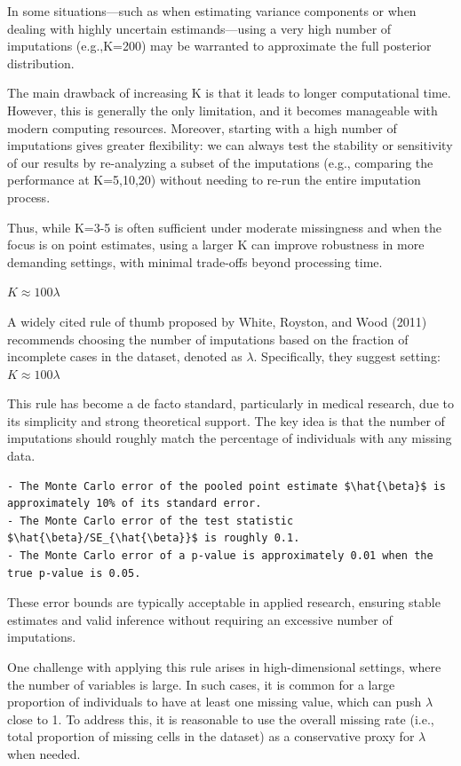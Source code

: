 \documentclass{article}
\begin{document}
In some situations---such as when estimating variance components or when
dealing with highly uncertain estimands---using a very high number of
imputations (e.g.,K=200) may be warranted to approximate the full
posterior distribution.

The main drawback of increasing K is that it leads to longer
computational time. However, this is generally the only limitation, and
it becomes manageable with modern computing resources. Moreover,
starting with a high number of imputations gives greater flexibility: we
can always test the stability or sensitivity of our results by
re-analyzing a subset of the imputations (e.g., comparing the
performance at K=5,10,20) without needing to re-run the entire
imputation process.

Thus, while K=3-5 is often sufficient under moderate missingness and
when the focus is on point estimates, using a larger K can improve
robustness in more demanding settings, with minimal trade-offs beyond
processing time.

\(K \approx 100\lambda\)

A widely cited rule of thumb proposed by White, Royston, and Wood (2011)
recommends choosing the number of imputations based on the fraction of
incomplete cases in the dataset, denoted as \(\lambda\). Specifically,
they suggest setting:\(K \approx 100\lambda\)

This rule has become a de facto standard, particularly in medical
research, due to its simplicity and strong theoretical support. The key
idea is that the number of imputations should roughly match the
percentage of individuals with any missing data.

\begin{verbatim}
- The Monte Carlo error of the pooled point estimate $\hat{\beta}$ is approximately 10% of its standard error.
- The Monte Carlo error of the test statistic $\hat{\beta}/SE_{\hat{\beta}}$ is roughly 0.1.
- The Monte Carlo error of a p-value is approximately 0.01 when the true p-value is 0.05.
\end{verbatim}

These error bounds are typically acceptable in applied research,
ensuring stable estimates and valid inference without requiring an
excessive number of imputations.

One challenge with applying this rule arises in high-dimensional
settings, where the number of variables is large. In such cases, it is
common for a large proportion of individuals to have at least one
missing value, which can push \(\lambda\) close to 1. To address this,
it is reasonable to use the overall missing rate (i.e., total proportion
of missing cells in the dataset) as a conservative proxy for \(\lambda\)
when needed.
\end{document}

